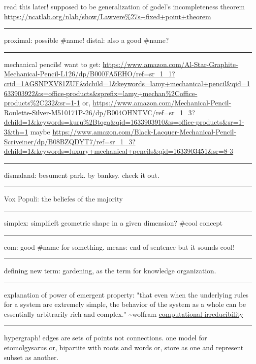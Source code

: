\documentclass[letterpaper]{article}
\begin{document}
read this later! supposed to be generalization of godel's incompleteness
theorem \url{https://ncatlab.org/nlab/show/Lawvere\%27s+fixed+point+theorem}

\noindent\rule{\textwidth}{0.5pt}

proximal: possible \#name! distal: also a good \#name?

\noindent\rule{\textwidth}{0.5pt}

mechanical pencils! want to get:
\url{https://www.amazon.com/Al-Star-Graphite-Mechanical-Pencil-L126/dp/B000FA5EHO/ref=sr\_1\_1?crid=1AGSNPXV81ZUF\&dchild=1\&keywords=lamy+mechanical+pencil\&qid=1633903922\&s=office-products\&sprefix=lamy+mechan\%2Coffice-products\%2C232\&sr=1-1}
or,
\url{https://www.amazon.com/Mechanical-Pencil-Roulette-Silver-M510171P-26/dp/B004OHNTVC/ref=sr\_1\_3?dchild=1\&keywords=kuru\%2Btoga\&qid=1633903910\&s=office-products\&sr=1-3\&th=1}
maybe
\url{https://www.amazon.com/Black-Lacquer-Mechanical-Pencil-Scriveiner/dp/B08BZQDYT7/ref=sr\_1\_3?dchild=1\&keywords=luxury+mechanical+pencils\&qid=1633903451\&sr=8-3}

\noindent\rule{\textwidth}{0.5pt}

dismaland: besument park. by banksy. check it out.

\noindent\rule{\textwidth}{0.5pt}

Vox Populi: the beliefes of the majority

\noindent\rule{\textwidth}{0.5pt}

simplex: simplileft geometric shape in a given dimension? \#cool concept

\noindent\rule{\textwidth}{0.5pt}

eom: good \#name for something. means: end of sentence but it sounds
cool!

\noindent\rule{\textwidth}{0.5pt}

defining new term: gardening, as the term for knowledge organization.

\noindent\rule{\textwidth}{0.5pt}

explanation of power of emergent property: "that even when the
underlying rules for a system are extremely simple, the behavior of the
system as a whole can be essentially arbitrarily rich and complex."
\textasciitilde{}wolfram
\href{https://www.wolframscience.com/nks/p737--computational-irreducibility/}{computational
irreducibility}

\noindent\rule{\textwidth}{0.5pt}

hypergraph! edges are sets of points not connections. one model for
etomolgysarus or, bipartite with roots and words or, store as one and
represent subset as another.
\end{document}
